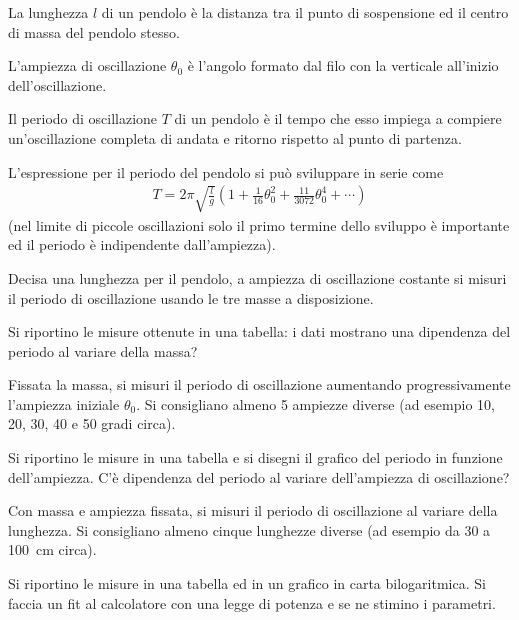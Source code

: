 \documentclass{lab1-article}
\begin{document}
\begin{article}
La lunghezza $l$ di un pendolo \`e la distanza tra il punto di sospensione ed
il centro di massa del pendolo stesso.

L'ampiezza di oscillazione $\theta_0$ \`e l'angolo formato dal filo con la
verticale all'inizio dell'oscillazione.

Il periodo di oscillazione $T$ di un pendolo \`e il tempo che esso impiega a
compiere un'oscillazione completa di andata e ritorno rispetto al punto di
partenza.

L'espressione per il periodo del pendolo si pu\`o sviluppare in serie come
\begin{align}
T = 2\pi\sqrt{\frac{l}{g}} \left( 1 + \frac{1}{16}\theta_0^2 +
\frac{11}{3072}\theta_0^4 + \cdots \right)
\end{align}
(nel limite di piccole oscillazioni solo il primo termine dello sviluppo
\`e importante ed il periodo \`e indipendente dall'ampiezza).


\secmeasurements



Decisa una lunghezza per il pendolo, a ampiezza di oscillazione costante si
misuri il periodo di oscillazione usando le tre masse a disposizione.

Si riportino le misure ottenute in una tabella: i dati mostrano una dipendenza
del periodo al variare della massa?



Fissata la massa, si misuri il periodo di oscillazione aumentando
progressivamente l'ampiezza iniziale $\theta_0$.
Si consigliano almeno 5 ampiezze diverse (ad esempio 10, 20, 30, 40 e 50 gradi
circa).

Si riportino le misure in una tabella e si disegni il grafico del periodo in
funzione dell'ampiezza. C'\`e dipendenza del periodo al variare dell'ampiezza
di oscillazione?



Con massa e ampiezza fissata, si misuri il periodo di oscillazione al variare
della lunghezza. Si consigliano almeno cinque lunghezze diverse (ad esempio da
30 a 100~cm circa).

Si riportino le misure in una tabella ed in un grafico in carta bilogaritmica.
Si faccia un fit al calcolatore con una legge di potenza e se ne stimino i
parametri.

\secconsiderations


\end{article}
\end{document}
